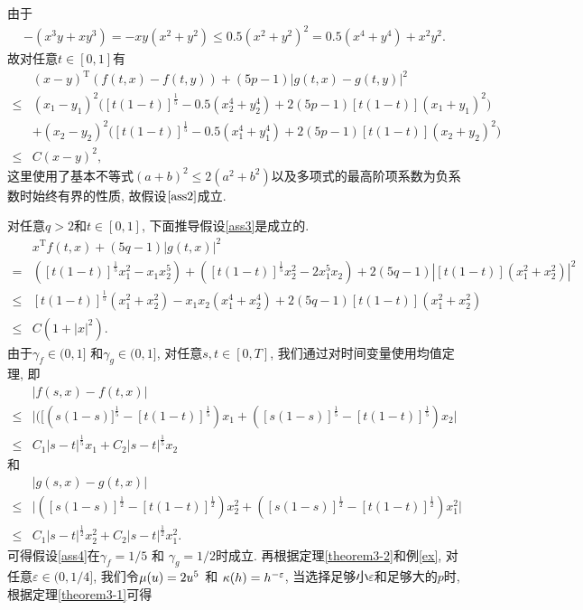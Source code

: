 由于
\begin{align*}
    -(x^3y+xy^3)=-xy(x^2+y^2)\leq 0.5(x^2+y^2)^2=0.5(x^4+y^4)+x^2y^2.
\end{align*}
故对任意$t\in[0,1]$有
\begin{align*}
    &(x-y)^{\mathrm{T}}(f(t,x)-f(t,y))+(5p-1)|g(t,x)-g(t,y)|^2\\
    \leq &(x_1-y_1)^2\bigg([t(1-t)]^{\frac{1}{5}}-0.5(x_2^4+y_2^4)+2(5p-1)[t(1-t)](x_1+y_1)^{2}\bigg)\\
    &+(x_2-y_2)^2\bigg([t(1-t)]^{\frac{1}{5}}-0.5(x_1^4+y_1^4)+2(5p-1)[t(1-t)](x_2+y_2)^{2}\bigg)\\
    \leq &C(x-y)^2,
\end{align*}
这里使用了基本不等式$(a+b)^{2}\leq 2(a^{2}+b^{2})$以及多项式的最高阶项系数为负系数时始终有界的性质, 故假设$\ref{ass2}$成立.
\par
对任意$q>2$和$t\in[0,1]$, 下面推导假设\ref{ass3}是成立的.
\begin{align*}
    & x^{\mathrm{T}}f(t,x)+(5q-1)|g(t,x)|^2\\
    =& ([t(1-t)]^{\frac{1}{5}}x_1^2-x_1x_2^5)+([t(1-t)]^{\frac{1}{5}}x_2^2-2x_1^5x_2)+2(5q-1)|[t(1-t)](x_1^{2}+x_2^{2})|^2\\
    \leq & [t(1-t)]^{\frac{1}{5}}(x_1^2+x_2^2)-x_1x_2(x_1^4+x_2^4)+2(5q-1)[t(1-t)](x_1^2+x_2^2)\\
    \leq & C(1+|x|^2).
\end{align*}
由于$\gamma_f\in (0,1]$ 和$\gamma_g\in (0,1]$, 对任意$s,t\in[0,T]$, 我们通过对时间变量使用均值定理, 即
\begin{align*}
    &|f(s,x)-f(t,x)|\\
    \leq& \big|([(s(1-s)]^{\frac{1}{5}}-[t(1-t)]^{\frac{1}{5}})x_1+([s(1-s)]^{\frac{1}{5}}-[t(1-t)]^{\frac{1}{5}})x_2\big|\\
    \leq& C_1|s-t|^{\frac{1}{5}}x_1+C_2|s-t|^{\frac{1}{5}}x_2
\end{align*}
和
\begin{align*}
    &|g(s,x)-g(t,x)|\\
    \leq& \big|([s(1-s)]^{\frac{1}{2}}-[t(1-t)]^{\frac{1}{2}})x_2^2+([s(1-s)]^{\frac{1}{2}}-[t(1-t)]^{\frac{1}{2}})x_1^2\big|\\
    \leq& C_1|s-t|^{\frac{1}{2}}x_2^2+C_2|s-t|^{\frac{1}{2}}x_1^2.
\end{align*}
可得假设\ref{ass4}在$\gamma_f=1/5$ 和 $\gamma_g=1/2$时成立. 再根据定理\ref{theorem3-2}和例\ref{ex}, 对任意$\varepsilon \in (0,1/4]$, 我们令$\mu (u)=2u^5$ 和 $\kappa(h)=h^{-\varepsilon}$, 当选择足够小$\varepsilon$和足够大的$p$时, 根据定理\ref{theorem3-1}可得

